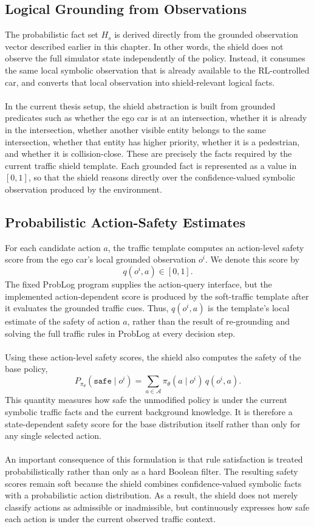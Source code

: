 \subsection{Logical Grounding from Observations}
The probabilistic fact set \(H_s\) is derived directly from the grounded observation vector described earlier in this chapter. In other words, the shield does not observe the full simulator state independently of the policy. Instead, it consumes the same local symbolic observation that is already available to the RL-controlled car, and converts that local observation into shield-relevant logical facts.
\\
\\
In the current thesis setup, the shield abstraction is built from grounded predicates such as whether the ego car is at an intersection, whether it is already in the intersection, whether another visible entity belongs to the same intersection, whether that entity has higher priority, whether it is a pedestrian, and whether it is collision-close. These are precisely the facts required by the current traffic shield template. Each grounded fact is represented as a value in \([0,1]\), so that the shield reasons directly over the confidence-valued symbolic observation produced by the environment.

\subsection{Probabilistic Action-Safety Estimates}
For each candidate action \(a\), the traffic template computes an action-level safety score from the ego car's local grounded observation \(o^i\). We denote this score by
\[
q(o^i,a)\in[0,1].
\]
The fixed ProbLog program supplies the action-query interface, but the implemented action-dependent score is produced by the soft-traffic template after it evaluates the grounded traffic cues. Thus, \(q(o^i,a)\) is the template's local estimate of the safety of action \(a\), rather than the result of re-grounding and solving the full traffic rules in ProbLog at every decision step.
\\
\\
Using these action-level safety scores, the shield also computes the safety of the base policy,
\[
P_{\pi_\theta}(\texttt{safe}\mid o^i)
=
\sum_{a\in\mathcal{A}} \pi_\theta(a\mid o^i)\, q(o^i,a).
\]
\noindent This quantity measures how safe the unmodified policy is under the current symbolic traffic facts and the current background knowledge. It is therefore a state-dependent safety score for the base distribution itself rather than only for any single selected action.
\\
\\
An important consequence of this formulation is that rule satisfaction is treated probabilistically rather than only as a hard Boolean filter. The resulting safety scores remain soft because the shield combines confidence-valued symbolic facts with a probabilistic action distribution. As a result, the shield does not merely classify actions as admissible or inadmissible, but continuously expresses how safe each action is under the current observed traffic context.


